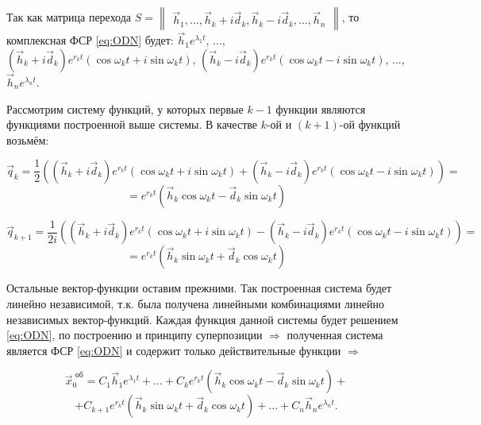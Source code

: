 Так как матрица перехода $S = \begin{Vmatrix*} \overrightarrow{h}_1, \ldots, \overrightarrow{h}_k + i \overrightarrow{d}_k, \overrightarrow{h}_k - i \overrightarrow{d}_k, \ldots, \overrightarrow{h}_n \end{Vmatrix*}$,
то комплексная ФСР \eqref{eq:ODN} будет: $\overrightarrow{h}_1 e^{\lambda_1 t}$, ..., $(\overrightarrow{h}_k + i \overrightarrow{d}_k) e^{r_k t} (\cos\omega_k t + i \sin \omega_k t)$, 
$(\overrightarrow{h}_k - i \overrightarrow{d}_k) e^{r_k t} (\cos\omega_k t - i \sin \omega_k t)$, ..., $\overrightarrow{h}_n e^{\lambda_n t}$. 

Рассмотрим систему функций, у которых первые $k-1$ функции являются функциями построенной выше системы. В качестве $k$-ой и $(k+1)$-ой функций возьмём:

\[
    \overrightarrow{q}_k = \frac{1}{2} \left((\overrightarrow{h}_k + i \overrightarrow{d}_k) e^{r_k t} (\cos \omega_k t + i \sin \omega_k t) + (\overrightarrow{h}_k - i \overrightarrow{d}_k) e^{r_k t} (\cos \omega_k t - i \sin \omega_k t) \right) = 
\]
\[
    = e^{r_k t} (\overrightarrow{h}_k \cos \omega_k t - \overrightarrow{d}_k \sin \omega_k t)
\]

\[
    \overrightarrow{q}_{k+1} = \frac{1}{2i} \left((\overrightarrow{h}_k + i \overrightarrow{d}_k) e^{r_k t} (\cos \omega_k t + i \sin \omega_k t) - (\overrightarrow{h}_k - i \overrightarrow{d}_k) e^{r_k t} (\cos \omega_k t - i \sin \omega_k t) \right)  = 
\]
\[
    = e^{r_k t} (\overrightarrow{h}_k \sin \omega_k t + \overrightarrow{d}_k \cos \omega_k t)
\]

Остальные вектор-функции оставим прежними. Так построенная система будет линейно независимой, т.к. была получена линейными комбинациями линейно независимых вектор-функций. Каждая функция данной системы будет решением \eqref{eq:ODN}, по построению и принципу суперпозиции $\Rightarrow$ полученная система является ФСР \eqref{eq:ODN} и содержит только действительные функции $\Rightarrow$

\begin{equation*}
    \overrightarrow{x}^{\text{ об}}_0 = C_1 \overrightarrow{h}_1 e^{\lambda_1 t} + ...+ C_k e^{r_k t} (\overrightarrow{h}_k \cos \omega_k t - \overrightarrow{d}_k \sin \omega_k t) +
\end{equation*}
\begin{equation*}
    + C_{k+1} e^{r_k t} (\overrightarrow{h}_k \sin \omega_k t + \overrightarrow{d}_k \cos \omega_k t) + ... + C_n \overrightarrow{h}_n e^{\lambda_n t}.
\end{equation*}

